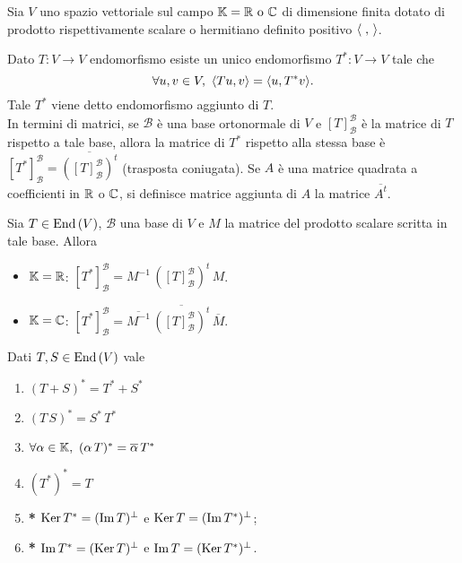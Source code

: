 
Sia $ V $ uno spazio vettoriale sul campo $ \mathbb{K} = \mathbb{R} \text{ o } \mathbb{C} $ di dimensione finita dotato di prodotto rispettivamente scalare o hermitiano definito positivo $ \langle \;, \, \rangle $.

\begin{thm}
	Dato $ T \colon V \to V $ endomorfismo esiste un unico endomorfismo $ T^{*} \colon V \to V $ tale che \[\forall u, v \in V, \ \scprd{Tu}{v} = \scprd{u}{T^{*}v}.\] Tale $ T^{*} $ viene detto endomorfismo aggiunto di $ T $. \\
	In termini di matrici, se $ \mathscr{B} $ è una base ortonormale di $ V $ e $ [T]_{\mathscr{B}}^{\mathscr{B}} $ è la matrice di $ T $ rispetto a tale base, allora la matrice di $ T^{*} $ rispetto alla stessa base è $ [T^{*}]_{\mathscr{B}}^{\mathscr{B}} = \overline{([T]_{\mathscr{B}}^{\mathscr{B}})^{t}} $ (trasposta coniugata). Se $ A $ è una matrice quadrata a coefficienti in $ \mathbb{R} $ o $ \mathbb{C} $, si definisce matrice aggiunta di $ A $ la matrice $ \overline{A^t} $.
\end{thm}

\begin{prop}
	Sia $ T \in \operatorname{End}{(V)} $, $ \mathscr{B} $ una base di $ V $ e $ M $ la matrice del prodotto scalare scritta in tale base. Allora 
	\begin{itemize}
		\item $ \mathbb{K} = \mathbb{R} $: $ [T^{*}]_{\mathscr{B}}^{\mathscr{B}} = M^{-1} \, ([T]_{\mathscr{B}}^{\mathscr{B}})^{t} \, M $.
		\item $ \mathbb{K} = \mathbb{C} $: $ [T^{*}]_{\mathscr{B}}^{\mathscr{B}} = \overline{M^{-1}} \, \overline{([T]_{\mathscr{B}}^{\mathscr{B}})^{t}} \, \overline{M} $.
	\end{itemize}
\end{prop}

\begin{prop}
	Dati $ T, S \in \operatorname{End}{(V)} $ vale
	\begin{enumerate}[label = (\roman*)]
		\item $ (T + S)^{*} = T^{*} + S^{*} $
		\item $ (T \, S)^{*} = S^{*} \, T^{*} $
		\item $ \forall \alpha \in \mathbb{K}, \ (\alpha \, T)^{*} = \overline{\alpha} \, T^{*} $
		\item $ (T^{*})^{*} = T $
		\item \textbf{*} $ \operatorname{Ker}{T^{*}} = (\operatorname{Im}{T})^{\perp} $ e $ \operatorname{Ker}{T} = (\operatorname{Im}{T^{*}})^{\perp} $;
		\item \textbf{*} $ \operatorname{Im}{T^{*}} = (\operatorname{Ker}{T})^{\perp} $ e $ \operatorname{Im}{T} = (\operatorname{Ker}{T^{*}})^{\perp} $.
	\end{enumerate}
\end{prop}


